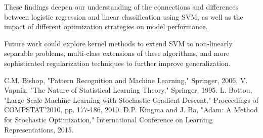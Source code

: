 \documentclass[journal, a4paper]{IEEEtran}
\begin{document}
These findings deepen our understanding of the connections and differences between logistic regression and linear classification using SVM, as well as the impact of different optimization strategies on model performance.

Future work could explore kernel methods to extend SVM to non-linearly separable problems, multi-class extensions of these algorithms, and more sophisticated regularization techniques to further improve generalization.

\begin{thebibliography}{00}
 C.M. Bishop, "Pattern Recognition and Machine Learning," Springer, 2006.
 V. Vapnik, "The Nature of Statistical Learning Theory," Springer, 1995.
 L. Bottou, "Large-Scale Machine Learning with Stochastic Gradient Descent," Proceedings of COMPSTAT'2010, pp. 177-186, 2010.
 D.P. Kingma and J. Ba, "Adam: A Method for Stochastic Optimization," International Conference on Learning Representations, 2015.
\end{thebibliography}
\end{document}
